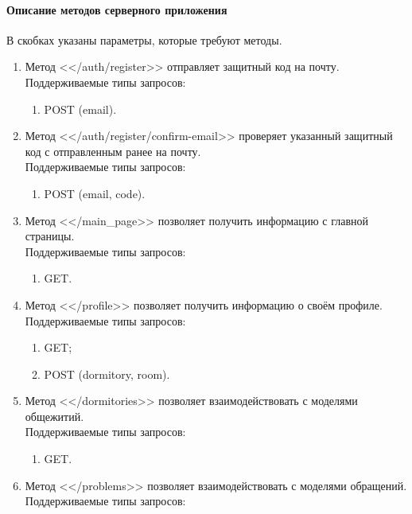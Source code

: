 \documentclass{../includes/TechDoc}
\begin{document}
    \paragraph{Описание методов серверного приложения}
    В скобках указаны параметры, которые требуют методы.
    \begin{enumerate}
        \item Метод <</auth/register>> отправляет защитный код на почту.\\
        Поддерживаемые типы запросов:
        \begin{enumerate}
            \item POST (email)\@.
        \end{enumerate}
        \item Метод <</auth/register/confirm-email>> проверяет указанный защитный код с отправленным ранее на почту.\\
        Поддерживаемые типы запросов:
        \begin{enumerate}
            \item POST (email, code)\@.
        \end{enumerate}
        \item Метод <</main\_page>> позволяет получить информацию с главной страницы.\\
        Поддерживаемые типы запросов:
        \begin{enumerate}
            \item GET\@.
        \end{enumerate}
        \item Метод <</profile>> позволяет получить информацию о своём профиле.\\
        Поддерживаемые типы запросов:
        \begin{enumerate}
            \item GET\@;
            \item POST (dormitory, room)\@.
        \end{enumerate}
        \item Метод <</dormitories>> позволяет взаимодействовать с моделями общежитий.\\
        Поддерживаемые типы запросов:
        \begin{enumerate}
            \item GET\@.
        \end{enumerate}
        \item Метод <</problems>> позволяет взаимодействовать с моделями обращений.
        Поддерживаемые типы запросов:

\end{enumerate}
\end{document}
